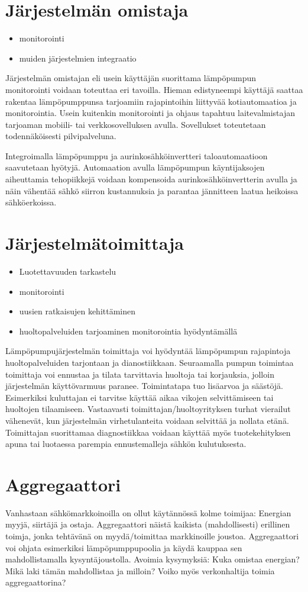 \section{Järjestelmän omistaja}
  \begin{itemize}
    \item monitorointi
    \item muiden järjestelmien integraatio
  \end{itemize}

  Järjestelmän omistajan eli usein käyttäjän suorittama lämpöpumpun monitorointi voidaan toteuttaa eri tavoilla. Hieman edistyneempi käyttäjä saattaa rakentaa lämpöpumppunsa tarjoamiin rajapintoihin liittyvää kotiautomaatioa ja monitorointia. Usein kuitenkin monitorointi ja ohjaus tapahtuu laitevalmistajan tarjoaman mobiili- tai verkkosovelluksen avulla. Sovellukset toteutetaan todennäköisesti pilvipalveluna.

  Integroimalla lämpöpumppu ja aurinkosähköinvertteri taloautomaatioon saavutetaan hyötyjä. Automaation avulla lämpöpumpun käyntijaksojen aiheuttamia tehopiikkejä voidaan kompensoida aurinkosähköinvertterin avulla ja näin vähentää sähkö siirron kustannuksia ja parantaa jännitteen laatua heikoissa sähköerkoissa.

\section{Järjestelmätoimittaja}
  \begin{itemize}
    \item Luotettavuuden tarkastelu
    \item monitorointi
    \item uusien ratkaisujen kehittäminen
    \item huoltopalveluiden tarjoaminen monitorointia hyödyntämällä
  \end{itemize}

  Lämpöpumpujärjestelmän toimittaja voi hyödyntää lämpöpumpun rajapintoja huoltopalveluiden tarjontaan ja dianostiikkaan. Seuraamalla pumpun toimintaa toimittaja voi ennustaa ja tilata tarvittavia huoltoja tai korjauksia, jolloin järjestelmän käyttövarmuus paranee. Toimintatapa tuo lisäarvoa ja säästöjä. Esimerkiksi kuluttajan ei tarvitse käyttää aikaa vikojen selvittämiseen tai huoltojen tilaamiseen. Vastaavasti toimittajan/huoltoyrityksen turhat vierailut vähenevät, kun järjestelmän virhetulanteita voidaan selvittää ja nollata etänä. Toimittajan suorittamaa diagnostiikkaa voidaan käyttää myös tuotekehityksen apuna tai luotaessa parempia ennustemalleja sähkön kulutuksesta.

  \section{Aggregaattori}

    Vanhastaan sähkömarkkoinoilla on ollut käytännössä kolme toimijaa: Energian myyjä, siirtäjä ja ostaja. Aggregaattori näistä kaikista (mahdollisesti) erillinen toimja, jonka tehtävänä on myydä/toimittaa markkinoille joustoa. Aggregaattori voi ohjata esimerkiksi lämpöpumppupoolia ja käydä kauppaa sen mahdollistamalla kysyntäjoustolla. Avoimia kysymyksiä: Kuka omistaa energian? Mikä laki tämän mahdollistaa ja milloin? Voiko myös verkonhaltija toimia aggregaattorina?
